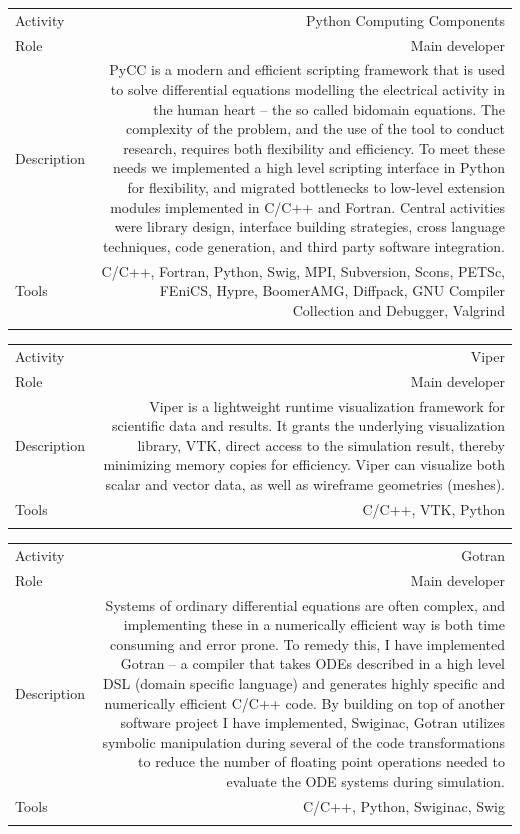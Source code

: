 \documentclass[english,a4paper,11pt]{article}
\begin{document}
\begin{tabular}{@{}LR}
Activity & Python Computing Components\\
Role & Main developer\\
Description & PyCC is a modern and efficient scripting framework that is used to solve differential equations modelling the electrical activity in the human heart – the so called bidomain equations. The complexity of the problem, and the use of the tool to conduct research, requires both flexibility and efficiency. To meet these needs we implemented a high level scripting interface in Python for flexibility, and migrated bottlenecks to low-level extension modules implemented in C/C++ and Fortran. Central activities were library design, interface building strategies, cross language techniques, code generation, and third party software integration.\\
Tools & C/C++, Fortran, Python, Swig, MPI, Subversion, Scons, PETSc, FEniCS, Hypre, BoomerAMG, Diffpack, GNU Compiler Collection and Debugger, Valgrind\\ 
\addlinespace \bottomrule[.1pt] \addlinespace
   \end{tabular}

\begin{tabular}{@{}LR}
Activity & Viper\\
Role & Main developer\\
Description & Viper is a lightweight runtime visualization framework for scientific data and results. It grants the underlying visualization library, VTK, direct access to the simulation result, thereby minimizing memory copies for efficiency. Viper can visualize both scalar and vector data, as well as wireframe geometries (meshes).\\
Tools & C/C++, VTK, Python\\ 
\addlinespace \bottomrule[.1pt] \addlinespace
   \end{tabular}

\begin{tabular}{@{}LR}
Activity & Gotran\\
Role & Main developer\\
Description & Systems of ordinary differential equations are often complex, and implementing these in a numerically efficient way is both time consuming and error prone. To remedy this, I have implemented Gotran – a compiler that takes ODEs described in a high level DSL (domain specific language) and generates highly specific and numerically efficient C/C++ code. By building on top of another software project I have implemented, Swiginac, Gotran utilizes symbolic manipulation during several of the code transformations to reduce the number of floating point operations needed to evaluate the ODE systems during simulation.\\
Tools & C/C++, Python, Swiginac, Swig\\ 
\addlinespace \bottomrule[.1pt] \addlinespace
   \end{tabular}
\end{document}
